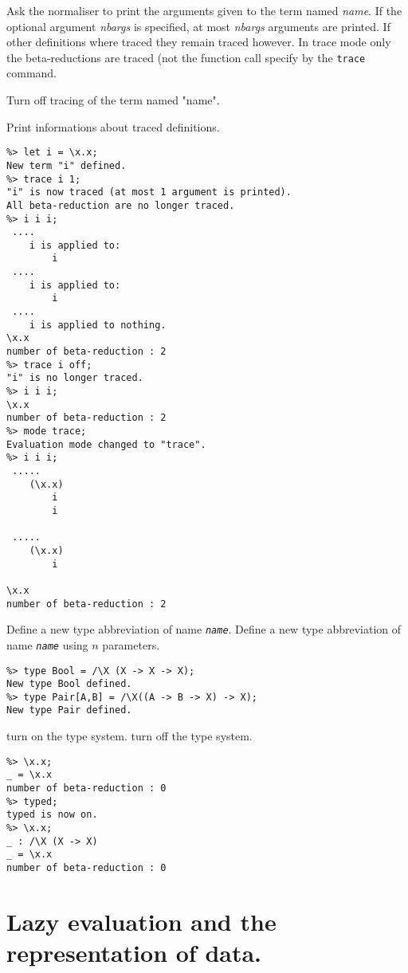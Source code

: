 {{\begin{definition}
 Ask the normaliser to
        print the arguments given to the term named {\it name}. If the
        optional argument {\it nbargs} is specified, at most {\it nbargs}
        arguments are printed.  If other definitions where traced they remain
        traced however.  In trace mode only the beta-reductions are traced (not
        the function call specify by the \verb!trace! command.

        Turn off tracing of the term named "name".

        Print informations about traced definitions.

\begin{verbatim}
%> let i = \x.x;
New term "i" defined.
%> trace i 1;
"i" is now traced (at most 1 argument is printed).
All beta-reduction are no longer traced.
%> i i i;
 ....
    i is applied to:
        i
 ....
    i is applied to:
        i
 ....
    i is applied to nothing.
\x.x
number of beta-reduction : 2
%> trace i off;
"i" is no longer traced.
%> i i i;
\x.x
number of beta-reduction : 2
%> mode trace;
Evaluation mode changed to "trace".
%> i i i;
 .....
    (\x.x)
        i
        i

 .....
    (\x.x)
        i

\x.x
number of beta-reduction : 2
\end{verbatim}

  Define a new type abbreviation of name {\tt\it name}.
Define a new type abbreviation of name {\tt\it name} using $n$ parameters.
\begin{verbatim}
%> type Bool = /\X (X -> X -> X);
New type Bool defined.
%> type Pair[A,B] = /\X((A -> B -> X) -> X);
New type Pair defined.
\end{verbatim}

        turn on the type system.
        turn off the type system.
\begin{verbatim}
%> \x.x;
_ = \x.x
number of beta-reduction : 0
%> typed;
typed is now on.
%> \x.x;
_ : /\X (X -> X)
_ = \x.x
number of beta-reduction : 0
\end{verbatim}

\end{definition}
      
\section{Lazy evaluation and the representation of data.}

}}
